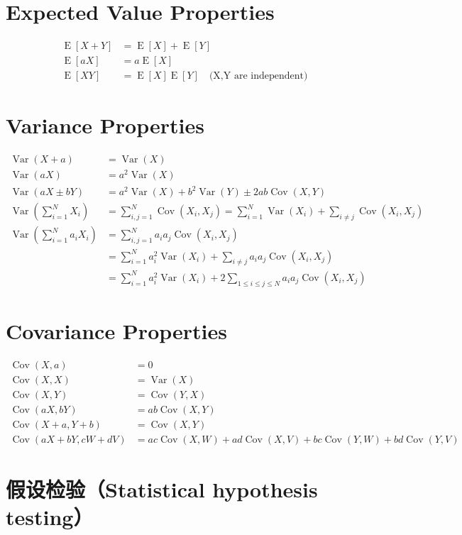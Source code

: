 \documentclass[11pt]{article}
\newcommand{\E}{\operatorname{E}}
\newcommand{\Cov}{\operatorname{Cov}}
\newcommand{\Var}{\operatorname{Var}}
\begin{document}
\section{Expected Value Properties}
\noindent
\begin{align*}
    \E[X+Y] &= \E[X] + \E[Y] \\
    \E[aX] &= a \E[X] \\
    \E[XY] &= \E[X]\E[Y] \quad \text{(X,Y are independent)}
\end{align*}

\section{Variance Properties}
\noindent
\begin{align*}
    \Var(X + a) &= \Var(X) \\
    \Var(aX) &= a^2\Var(X) \\
    \Var(aX \pm bY) &= a^2\Var(X) + b^2\Var(Y) \pm 2ab \Cov(X,Y) \\
    \Var(\sum_{i=1}^{N} X_i) &= \sum_{i,j=1}^{N}\Cov(X_i,X_j) = \sum_{i=1}^{N}\Var(X_i) + \sum_{i \neq j}\Cov(X_i,X_j) \\
    \Var(\sum_{i=1}^{N} a_i X_i) &= \sum_{i,j=1}^{N}a_i a_j\Cov(X_i,X_j) \\
    &= \sum_{i=1}^{N}a_i^2\Var(X_i) + \sum_{i \neq j} a_i a_j \Cov(X_i,X_j) \\
    &= \sum_{i=1}^{N}a_i^2\Var(X_i) + 2\sum_{1 \leq i \leq j \leq N} a_i a_j \Cov(X_i,X_j)
\end{align*}

\section{Covariance Properties}
\noindent
\begin{align*}
    \Cov(X,a) &= 0 \\
    \Cov(X,X) &= \Var(X) \\
    \Cov(X,Y) &= \Cov(Y,X) \\
    \Cov(aX,bY) &= ab\Cov(X,Y) \\
    \Cov(X+a,Y+b) &= \Cov(X,Y) \\
    \Cov(aX+bY,cW+dV) &= ac\Cov(X,W)+ad\Cov(X,V)+bc\Cov(Y,W)+bd\Cov(Y,V)
\end{align*}

\section{假设检验（Statistical hypothesis testing）}
\end{document}
